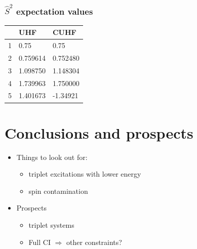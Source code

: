 \documentclass[aspectratio=169]{beamer}
\begin{document}
\begin{frame}
    \frametitle{$\hat{S}^2$ expectation values}
    \begin{table}[h]
        \label{tab:spincon}
        \begin{tabular}{l|l|l}
            & UHF      & CUHF     \\
          \hline
          1 & 0.75     & 0.75     \\
          2 & 0.759614 & 0.752480 \\
          3 & 1.098750 & 1.148304 \\
          4 & 1.739963 & 1.750000 \\
          5 & 1.401673 & -1.34921
        \end{tabular}
      \end{table}
\end{frame}
\section{Conclusions and prospects}
\begin{frame}
    \begin{itemize}
        \item Things to look out for:
        \begin{itemize}
            \item triplet excitations with lower energy
            \item spin contamination
        \end{itemize}
        \item Prospects
        \begin{itemize}
            \item triplet systems
            \item Full CI $\Longrightarrow$ other constraints?
        \end{itemize}
    \end{itemize}
    
\end{frame}

\titleframe
\end{document}
